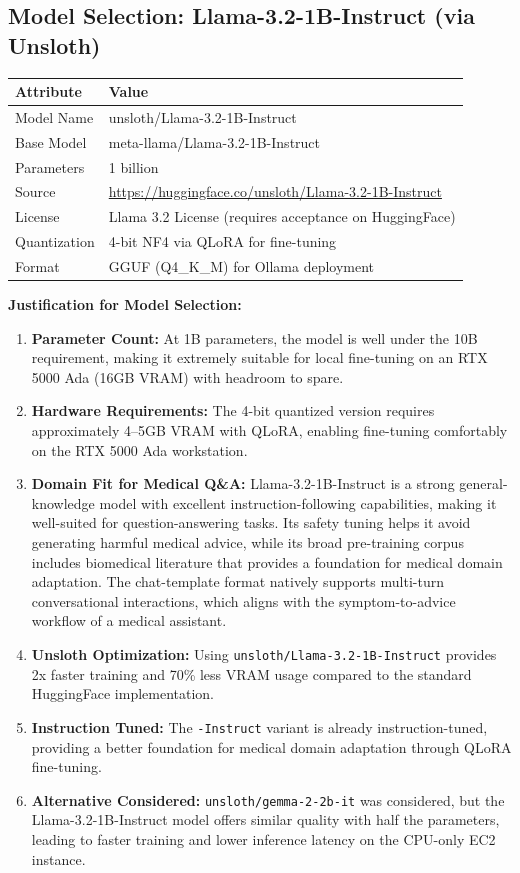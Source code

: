 \documentclass[11pt,a4paper]{article}
\begin{document}
\subsection{Model Selection: Llama-3.2-1B-Instruct (via Unsloth)}

\begin{table}[H]
\centering
\begin{tabular}{@{}ll@{}}
\toprule
\textbf{Attribute} & \textbf{Value} \\
\midrule
Model Name & unsloth/Llama-3.2-1B-Instruct \\
Base Model & meta-llama/Llama-3.2-1B-Instruct \\
Parameters & 1 billion \\
Source & \url{https://huggingface.co/unsloth/Llama-3.2-1B-Instruct} \\
License & Llama 3.2 License (requires acceptance on HuggingFace) \\
Quantization & 4-bit NF4 via QLoRA for fine-tuning \\
Format & GGUF (Q4\_K\_M) for Ollama deployment \\
\bottomrule
\end{tabular}
\end{table}

\textbf{Justification for Model Selection:}

\begin{enumerate}
    \item \textbf{Parameter Count:} At 1B parameters, the model is well under the 10B requirement, making it extremely suitable for local fine-tuning on an RTX 5000 Ada (16GB VRAM) with headroom to spare.
    \item \textbf{Hardware Requirements:} The 4-bit quantized version requires approximately 4--5GB VRAM with QLoRA, enabling fine-tuning comfortably on the RTX 5000 Ada workstation.
    \item \textbf{Domain Fit for Medical Q\&A:} Llama-3.2-1B-Instruct is a strong general-knowledge model with excellent instruction-following capabilities, making it well-suited for question-answering tasks. Its safety tuning helps it avoid generating harmful medical advice, while its broad pre-training corpus includes biomedical literature that provides a foundation for medical domain adaptation. The chat-template format natively supports multi-turn conversational interactions, which aligns with the symptom-to-advice workflow of a medical assistant.
    \item \textbf{Unsloth Optimization:} Using \texttt{unsloth/Llama-3.2-1B-Instruct} provides 2x faster training and 70\% less VRAM usage compared to the standard HuggingFace implementation.
    \item \textbf{Instruction Tuned:} The \texttt{-Instruct} variant is already instruction-tuned, providing a better foundation for medical domain adaptation through QLoRA fine-tuning.
    \item \textbf{Alternative Considered:} \texttt{unsloth/gemma-2-2b-it} was considered, but the Llama-3.2-1B-Instruct model offers similar quality with half the parameters, leading to faster training and lower inference latency on the CPU-only EC2 instance.
\end{enumerate}
\end{document}
